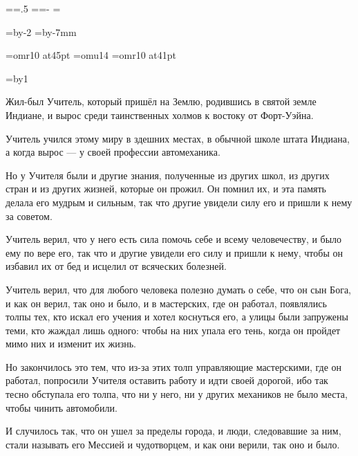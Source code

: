 \pdfpagewidth=297mm
\pdfpageheight=210mm
 \pdfhorigin=1in \pdfvorigin=1in
\shhtotal=\pdfpagewidth \htotal=.5\shhtotal
\vtotal=\pdfpageheight \shvoffset=-\pdfvorigin
\shoutline=0pt
\shstaplewidth=0pt
\shcrop=0pt
\shfootline={}

\horigin=3.5mm
\vorigin=2.5mm
\hsize=\htotal \advance\hsize by-2\horigin
\vsize=\vtotal \advance\vsize by-7mm

\font\chapfont=omr10 at45pt
\font\handfont=omu14
\font\bukvfont=omr10 at41pt

\nopagenumbers

\raggedbottom

{}
\vskip3cm

\begingroup
\baselineskip=17pt
\newcount\n
\everypar={\advance\n by1 \hang}
\parskip=30pt
\raggedright
\handfont

Жил-был Учитель, который пришёл на Землю, родившись в святой земле Индиане, и вырос среди таинственных холмов к востоку от Форт-Уэйна.

Учитель учился этому миру в здешних местах, в обычной школе штата Индиана, а когда вырос --- у своей профессии автомеханика.

Но у Учителя были и другие знания, полученные из других школ, из других стран и из других жизней, которые он прожил. Он помнил их, и эта память делала его мудрым и сильным, так что другие увидели силу его и пришли к нему за советом.

Учитель верил, что у него есть сила помочь себе и всему человечеству, и было ему по вере его, так что и другие увидели его силу и пришли к нему, чтобы он избавил их от бед и исцелил от всяческих болезней.

Учитель верил, что для любого человека полезно думать о себе, что он сын Бога, и как он верил, так оно и было, и в мастерских, где он работал, появлялись толпы тех, кто искал его учения и хотел коснуться его, а улицы были запружены теми, кто жаждал лишь одного: чтобы на них упала его тень, когда он пройдет мимо них и изменит их жизнь.

Но закончилось это тем, что из-за этих толп управляющие мастерскими, где он работал, попросили Учителя оставить работу и идти своей дорогой, ибо так тесно обступала его толпа, что ни у него, ни у других механиков не было места, чтобы чинить автомобили.

И случилось так, что он ушел за пределы города, и люди, следовавшие за ним, стали называть его Мессией и чудотворцем, и как они верили, так оно и было.

